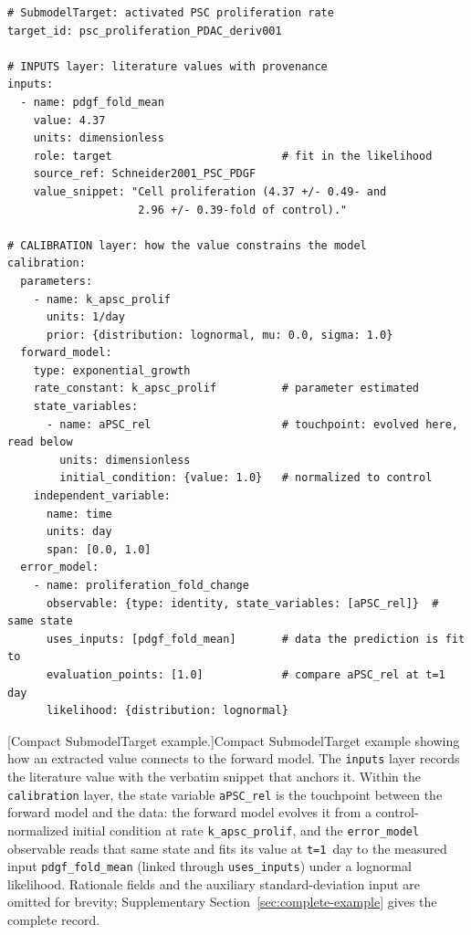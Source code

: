 {\small
\begin{verbatim}
# SubmodelTarget: activated PSC proliferation rate
target_id: psc_proliferation_PDAC_deriv001

# INPUTS layer: literature values with provenance
inputs:
  - name: pdgf_fold_mean
    value: 4.37
    units: dimensionless
    role: target                          # fit in the likelihood
    source_ref: Schneider2001_PSC_PDGF
    value_snippet: "Cell proliferation (4.37 +/- 0.49- and
                    2.96 +/- 0.39-fold of control)."

# CALIBRATION layer: how the value constrains the model
calibration:
  parameters:
    - name: k_apsc_prolif
      units: 1/day
      prior: {distribution: lognormal, mu: 0.0, sigma: 1.0}
  forward_model:
    type: exponential_growth
    rate_constant: k_apsc_prolif          # parameter estimated
    state_variables:
      - name: aPSC_rel                    # touchpoint: evolved here, read below
        units: dimensionless
        initial_condition: {value: 1.0}   # normalized to control
    independent_variable:
      name: time
      units: day
      span: [0.0, 1.0]
  error_model:
    - name: proliferation_fold_change
      observable: {type: identity, state_variables: [aPSC_rel]}  # same state
      uses_inputs: [pdgf_fold_mean]       # data the prediction is fit to
      evaluation_points: [1.0]            # compare aPSC_rel at t=1 day
      likelihood: {distribution: lognormal}
\end{verbatim}}
\setcounter{figure}{1}%
[Compact SubmodelTarget example.]{Compact SubmodelTarget example showing how an extracted value connects to the forward model. The \texttt{inputs} layer records the literature value with the verbatim snippet that anchors it. Within the \texttt{calibration} layer, the state variable \texttt{aPSC\_rel} is the touchpoint between the forward model and the data: the forward model evolves it from a control-normalized initial condition at rate \texttt{k\_apsc\_prolif}, and the \texttt{error\_model} observable reads that same state and fits its value at \texttt{t=1}~day to the measured input \texttt{pdgf\_fold\_mean} (linked through \texttt{uses\_inputs}) under a lognormal likelihood. Rationale fields and the auxiliary standard-deviation input are omitted for brevity; Supplementary Section~\ref{sec:complete-example} gives the complete record.}
\label{fig:compact-schema}
